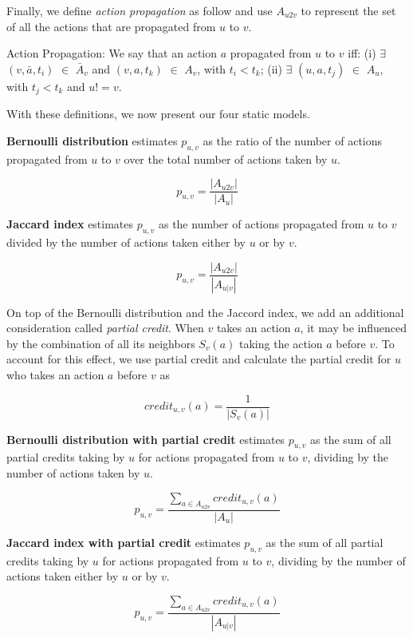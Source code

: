 Finally, we define {\em action propagation} as follow and use $A_{u2v}$ to represent the set of all the actions that are propagated from $u$ to $v$. 

\begin{definition}{Action Propagation:}
We say that an action $a$ propagated from $u$ to $v$ iff: (i) $\exists$ $(v, \bar{a}, t_i)$ $\in$ $\bar{A}_v$ 
and $(v, a, t_k)$ $\in$ $A_v$, with $t_i < t_k$; (ii) $\exists$ $(u, a, t_j)$ $\in$ $A_u$, with $t_j < t_k$ and $u != v$. 
\end{definition}

With these definitions, we now present our four static models.

{\bf Bernoulli distribution} estimates $p_{u,v}$ as the ratio of the number of actions 
propagated from $u$ to $v$ over the total number of actions taken by $u$.

$$p_{u,v} = \frac{|A_{u2v}|}{|A_u|}$$ 

{\bf Jaccard index} estimates 
$p_{u,v}$ as the number of actions propagated from $u$ to $v$ divided by 
the number of actions taken either by $u$ or by $v$.

$$p_{u,v} = \frac{|A_{u2v}|}{|A_{u|v}|}$$ 

On top of the Bernoulli distribution and the Jaccord index,
we add an additional consideration called {\em partial credit}.
When $v$ takes an action $a$, it may be influenced by the combination of all its neighbors $S_v(a)$ 
taking the action $a$ before $v$. %
To account for this effect, we use partial credit 
and calculate the partial credit for $u$ who takes an action $a$ before $v$ as 

$$credit_{u,v}(a) = \frac{1}{|S_v(a)|}$$

{\bf Bernoulli distribution with partial credit} 
estimates $p_{u,v}$ as the sum of all partial credits taking by $u$ for actions propagated from $u$ to $v$, 
dividing by the number of actions taken by $u$. 

$$p_{u,v} = \frac{\sum\limits_{a \in A_{u2v}}{credit_{u,v}(a)}}{|A_u|}$$

{\bf Jaccard index with partial credit} 
estimates $p_{u,v}$ as the sum of all partial credits taking by $u$ for actions propagated from $u$ to $v$, 
dividing by the number of actions taken either by $u$ or by $v$. 

$$p_{u,v} = \frac{\sum\limits_{a \in A_{u2v}}{credit_{u,v}(a)}}{|A_{u|v}|}$$





